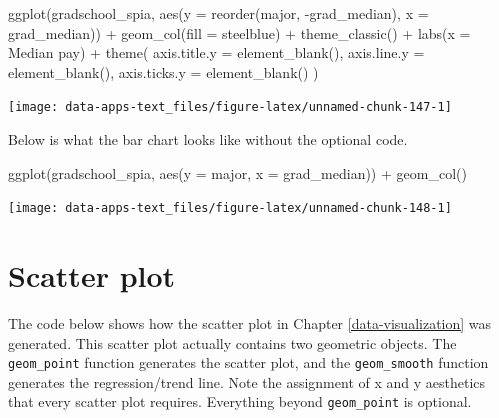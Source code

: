 \documentclass[
]{book}
\makeatletter
\newenvironment{Shaded}{\begin{snugshade}}{\end{snugshade}}
\newcommand{\AttributeTok}[1]{\textcolor[rgb]{0.61,0.61,0.61}{#1}}
\newcommand{\FunctionTok}[1]{\textcolor[rgb]{0,0,0}{#1}}
\newcommand{\NormalTok}[1]{#1}
\newcommand{\SpecialCharTok}[1]{\textcolor[rgb]{0,0,0}{#1}}
\newcommand{\StringTok}[1]{\textcolor[rgb]{0.5,0.5,0.5}{#1}}
\newenvironment{kframe}{%
\medskip{}
\setlength{\fboxsep}{.8em}
 \def\at@end@of@kframe{}%
 \ifinner\ifhmode%
  \def\at@end@of@kframe{\end{minipage}}%
  \begin{minipage}{\columnwidth}%
 \fi\fi%
 \def\FrameCommand##1{\hskip\@totalleftmargin \hskip-\fboxsep
 \colorbox{shadecolor}{##1}\hskip-\fboxsep
     \hskip-\linewidth \hskip-\@totalleftmargin \hskip\columnwidth}%
 \MakeFramed {\advance\hsize-\width
   \@totalleftmargin\z@ \linewidth\hsize
   \@setminipage}}%
 {\par\unskip\endMakeFramed%
 \at@end@of@kframe}
\renewenvironment{Shaded}{\begin{kframe}}{\end{kframe}}
\makeatother
\begin{document}
\begin{Shaded}
\begin{Highlighting}[]
\FunctionTok{ggplot}\NormalTok{(gradschool\_spia, }\FunctionTok{aes}\NormalTok{(}\AttributeTok{y =} \FunctionTok{reorder}\NormalTok{(major, }\SpecialCharTok{{-}}\NormalTok{grad\_median), }\AttributeTok{x =}\NormalTok{ grad\_median)) }\SpecialCharTok{+}
  \FunctionTok{geom\_col}\NormalTok{(}\AttributeTok{fill =} \StringTok{\textquotesingle{}steelblue\textquotesingle{}}\NormalTok{) }\SpecialCharTok{+}
  \FunctionTok{theme\_classic}\NormalTok{() }\SpecialCharTok{+}
  \FunctionTok{labs}\NormalTok{(}\AttributeTok{x =} \StringTok{\textquotesingle{}Median pay\textquotesingle{}}\NormalTok{) }\SpecialCharTok{+}
  \FunctionTok{theme}\NormalTok{(}
    \AttributeTok{axis.title.y =} \FunctionTok{element\_blank}\NormalTok{(),}
    \AttributeTok{axis.line.y =} \FunctionTok{element\_blank}\NormalTok{(),}
    \AttributeTok{axis.ticks.y =} \FunctionTok{element\_blank}\NormalTok{()}
\NormalTok{  )}
\end{Highlighting}
\end{Shaded}

\begin{center}\texttt{[image: data-apps-text\_files/figure-latex/unnamed-chunk-147-1]} \end{center}

Below is what the bar chart looks like without the optional code.

\begin{Shaded}
\begin{Highlighting}[]
\FunctionTok{ggplot}\NormalTok{(gradschool\_spia, }\FunctionTok{aes}\NormalTok{(}\AttributeTok{y =}\NormalTok{ major, }\AttributeTok{x =}\NormalTok{ grad\_median)) }\SpecialCharTok{+}
  \FunctionTok{geom\_col}\NormalTok{()}
\end{Highlighting}
\end{Shaded}

\begin{center}\texttt{[image: data-apps-text\_files/figure-latex/unnamed-chunk-148-1]} \end{center}

\hypertarget{scatter-plot}{%
\section{Scatter plot}\label{scatter-plot}}

The code below shows how the scatter plot in Chapter \ref{data-visualization} was generated. This scatter plot actually contains two geometric objects. The \texttt{geom\_point} function generates the scatter plot, and the \texttt{geom\_smooth} function generates the regression/trend line. Note the assignment of x and y aesthetics that every scatter plot requires. Everything beyond \texttt{geom\_point} is optional.
\end{document}
